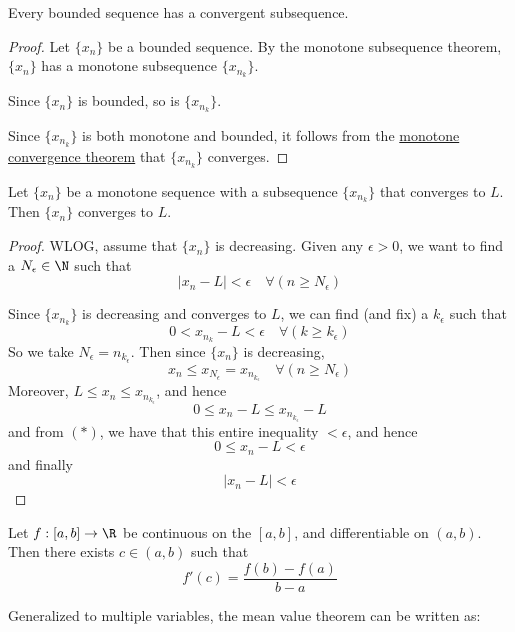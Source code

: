 \label{d277ad0}

Every bounded sequence has a convergent subsequence.

\begin{proof}
	\def\xn{\{x_n\}}
	\def\xnk{\{x_{n_k}\}}

	Let $\xn$ be a bounded sequence. By the monotone subsequence
	theorem, $\xn$ has a monotone subsequence $\xnk$.

	Since $\xn$ is bounded, so is $\xnk$.

	Since $\xnk$ is both monotone and bounded, it follows from the
	\href{ca25eb7}{monotone convergence theorem} that $\xnk$
	converges.
\end{proof}


\label{aaf3ba6}

Let $\{x_n\}$ be a monotone sequence with a subsequence $\{x_{n_k}\}$
that converges to $L$. Then $\{x_n\}$ converges to $L$.

\begin{proof}
	WLOG, assume that $\{x_n\}$ is decreasing.
	Given any $\epsilon>0$, we want to find a $N_\epsilon\in\N$ such that
	$$
		|x_n-L|<\epsilon\quad\forall(n\geq N_\epsilon)
	$$

	Since $\{x_{n_k}\}$ is decreasing and converges to $L$, we can find
	(and fix) a $k_\epsilon$ such that
	\begin{equation}
		0<x_{n_k}-L<\epsilon\quad\forall(k\geq k_\epsilon)\tag*{($*$)}
	\end{equation}
	So we take $N_\epsilon=n_{k_\epsilon}$. Then since $\{x_n\}$ is
	decreasing,
	$$
		x_n\leq x_{N_\epsilon}=x_{n_{k_\epsilon}}\quad\forall(n\geq N_\epsilon)
	$$
	Moreover, $L\leq x_n\leq x_{n_{k_\epsilon}}$, and hence
	$$0\leq x_n-L\leq x_{n_{k_\epsilon}}-L$$
	and from $(*)$, we have that this entire inequality $<\epsilon$, and hence
	$$0\leq x_n-L<\epsilon$$
	and finally
	$$|x_n-L|<\epsilon$$
\end{proof}

\label{d37aa2b}

Let $f:[a,b]\to\R$ be continuous on the $[a,b]$, and differentiable on
$(a,b)$. Then there exists $c\in(a,b)$ such that
$$
	f'(c)=\frac{f(b)-f(a)}{b-a}
$$

Generalized to multiple variables, the mean value theorem can be
written as:

